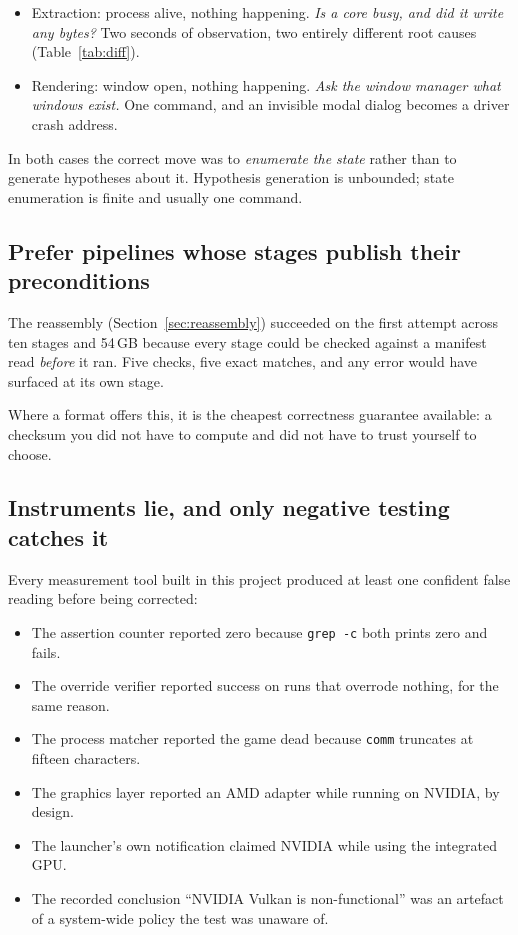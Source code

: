 \begin{itemize}
\item Extraction: process alive, nothing happening. \emph{Is a core busy, and did
      it write any bytes?} Two seconds of observation, two entirely different
      root causes (Table~\ref{tab:diff}).
\item Rendering: window open, nothing happening. \emph{Ask the window manager
      what windows exist.} One command, and an invisible modal dialog becomes a
      driver crash address.
\end{itemize}

In both cases the correct move was to \emph{enumerate the state} rather than to
generate hypotheses about it. Hypothesis generation is unbounded; state
enumeration is finite and usually one command.

\subsection{Prefer pipelines whose stages publish their preconditions}

The reassembly (Section~\ref{sec:reassembly}) succeeded on the first attempt
across ten stages and 54\,GB because every stage could be checked against a
manifest read \emph{before} it ran. Five checks, five exact matches, and any
error would have surfaced at its own stage.

Where a format offers this, it is the cheapest correctness guarantee available:
a checksum you did not have to compute and did not have to trust yourself to
choose.

\subsection{Instruments lie, and only negative testing catches it}

Every measurement tool built in this project produced at least one confident
false reading before being corrected:

\begin{itemize}
\item The assertion counter reported zero because \verb|grep -c| both prints zero
      and fails.
\item The override verifier reported success on runs that overrode nothing, for
      the same reason.
\item The process matcher reported the game dead because \verb|comm| truncates at
      fifteen characters.
\item The graphics layer reported an AMD adapter while running on NVIDIA, by
      design.
\item The launcher's own notification claimed NVIDIA while using the integrated
      GPU.
\item The recorded conclusion ``NVIDIA Vulkan is non-functional'' was an artefact
      of a system-wide policy the test was unaware of.
\end{itemize}

